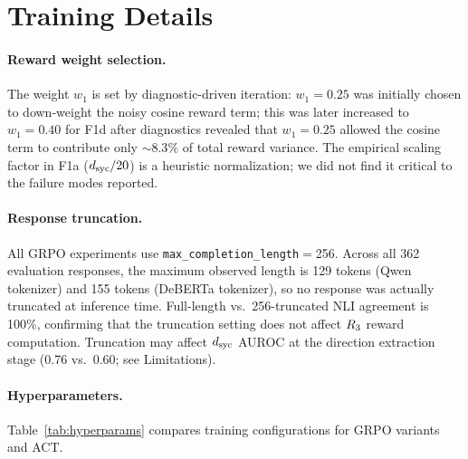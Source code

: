 \section{Training Details}
\label{app:training}

\paragraph{Reward weight selection.}
The weight $w_1$ is set by diagnostic-driven iteration: $w_1{=}0.25$ was initially chosen to down-weight the noisy cosine reward term; this was later increased to $w_1{=}0.40$ for F1d after diagnostics revealed that $w_1{=}0.25$ allowed the cosine term to contribute only ${\sim}8.3\%$ of total reward variance.
The empirical scaling factor in F1a ($d_{\text{syc}}/20$) is a heuristic normalization; we did not find it critical to the failure modes reported.

\paragraph{Response truncation.}
All GRPO experiments use \texttt{max\_completion\_length}$=$256.
Across all 362 evaluation responses, the maximum observed length is 129 tokens (Qwen tokenizer) and 155 tokens (DeBERTa tokenizer), so no response was actually truncated at inference time.
Full-length vs.\ 256-truncated NLI agreement is 100\%, confirming that the truncation setting does not affect $R_3$ reward computation.
Truncation may affect $d_{\text{syc}}$ AUROC at the direction extraction stage (0.76 vs.\ 0.60; see Limitations).

\paragraph{Hyperparameters.}
Table~\ref{tab:hyperparams} compares training configurations for GRPO variants and ACT.

